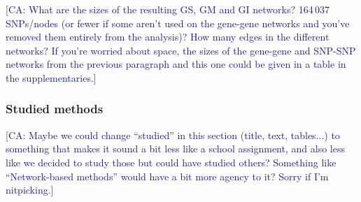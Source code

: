\documentclass[twocolumn, 11pt]{article}
\newcommand{\cazcom}[2]{{\uline{#1}}\unskip\space\textcolor{MidnightBlue}{[CA: #2]}}
\begin{document}
\cazcom{}{What are the sizes of the resulting GS, GM and GI networks? 164\,037 SNPs/nodes (or fewer if some aren't used on the gene-gene networks and you've removed them entirely from the analysis)? How many edges in the different networks? If you're worried about space, the sizes of the gene-gene and SNP-SNP networks from the previous paragraph and this one could be given in a table in the supplementaries.}

\subsubsection{Studied methods}
\label{methods:methods}
\cazcom{}{Maybe we could change ``studied'' in this section (title, text, tables...) to something that makes it sound a bit less like a school assignment, and also less like we decided to study those but could have studied others? Something like ``Network-based methods'' would have a bit more agency to it? Sorry if I'm nitpicking.}
\end{document}
